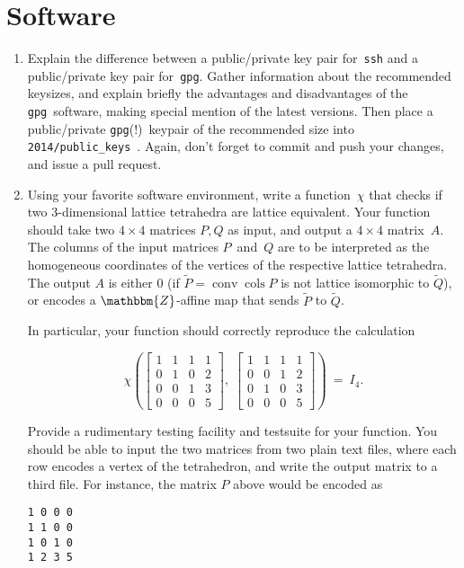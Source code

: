 \documentclass[11pt]{amsart}
\newcommand{\Z}{\mathbbm{Z}}
\DeclareMathOperator{\conv}{conv}
\DeclareMathOperator{\cols}{cols}
\begin{document}
\bigskip
\bigskip
\section*{Software}

\begin{enumerate}
\setlength{\itemsep}{2ex}
\setcounter{enumi}{2}
\item Explain the difference between a public/private key pair
  for~\texttt{ssh} and a public/private key pair
  for~\texttt{gpg}. Gather information about the recommended keysizes,
  and explain briefly the advantages and disadvantages of the
  \texttt{gpg}~software, making special mention of the latest
  versions.  Then place a public/private \texttt{gpg}(!)~keypair of
  the recommended size into \texttt{2014/public\_keys}~. Again, don't
  forget to commit and push your changes, and issue a pull request.

\item Using your favorite software environment, write a function~$\chi$ that
  checks if two 3-dimensional lattice tetrahedra are lattice
  equivalent.
%
  Your function should take two $4\times4$ matrices $P,Q$ as input,
  and output a $4\times 4$ matrix~$A$.
%
  The columns of the input matrices $P$~and~$Q$ are to be interpreted
  as the homogeneous coordinates of the vertices of the respective
  lattice tetrahedra. The output $A$ is either $0$ (if $\widetilde P = \conv\cols P$
  is not lattice isomorphic to $\widetilde Q$), or encodes a
  $\Z$-affine map that sends $\widetilde P$ to $\widetilde Q$.

  In particular, your function should correctly reproduce the calculation

  \[
  \chi\left(
  \begin{bmatrix}
    1 & 1 & 1 & 1 \\
    0 & 1 & 0 & 2 \\
    0 & 0 & 1 & 3 \\
    0 & 0 & 0 & 5
  \end{bmatrix}
  ,\;
  \begin{bmatrix}
    1 & 1 & 1 & 1 \\
    0 & 0 & 1 & 2 \\
    0 & 1 & 0 & 3 \\
    0 & 0 & 0 & 5
  \end{bmatrix}
  \right)
  \ = \ 
  I_4.
  \]

\medskip
  Provide a rudimentary testing facility and testsuite for your
  function. You should be able to input the two matrices from two
  plain text files, where each row encodes a vertex of the
  tetrahedron, and write the output matrix to a third file. For
  instance, the matrix $P$ above would be encoded as
\begin{verbatim}
1 0 0 0
1 1 0 0
1 0 1 0
1 2 3 5
\end{verbatim}


\end{enumerate}
\end{document}
